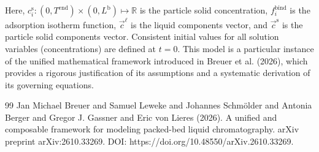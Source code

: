 \documentclass{article}
\begin{document}
Here, $c^{\mathrm{s}}_{i}\colon (0, T^{\mathrm{end}}) \times (0, L^{\mathrm{b}}) \mapsto \mathbb{R}$ is the particle solid concentration, $f^{\mathrm{bind}}_{i}$ is the adsorption isotherm function, $\vec{c}^{\mathrm{\ell}}$ is the liquid components vector, and $\vec{c}^{\mathrm{s}}$ is the particle solid components vector.
Consistent initial values for all solution variables (concentrations) are defined at $t = 0$.
This model is a particular instance of the unified mathematical framework introduced in Breuer et al. (2026), which provides a rigorous justification of its assumptions and a systematic derivation of its governing equations.
\begin{thebibliography}{99}
     Jan Michael Breuer and Samuel Leweke and Johannes Schmölder and Antonia Berger and Gregor J. Gassner and Eric von Lieres (2026). A unified and composable framework for modeling packed-bed liquid chromatography. arXiv preprint arXiv:2610.33269. DOI: https://doi.org/10.48550/arXiv.2610.33269.
\end{thebibliography}
\end{document}
